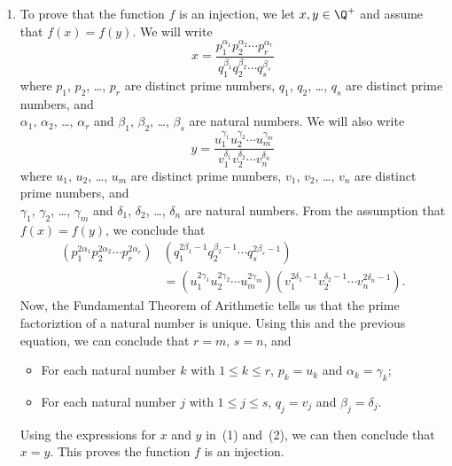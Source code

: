 \begin{enumerate}
\begin{enumerate}
\item To prove that the function $f$ is an injection, we let $x, y \in \Q^+$ and assume that $f(x) = f(y)$.  We will write
\begin{equation}
x = \dfrac{p_1^{\alpha_1} p_2^{\alpha_2} \cdots p_r^{\alpha_r}}{q_1^{\beta_1} q_2^{\beta_2} \cdots q_s^{\beta_s}}
\end{equation}
where $p_1$, $p_2$, \ldots, $p_r$ are distinct prime numbers, $q_1$, $q_2$, \ldots, $q_s$ are distinct prime numbers, and \\
$\alpha_1$, $\alpha_2$, \ldots, $\alpha_r$ and $\beta_1$, $\beta_2$, \ldots, $\beta_s$ are natural numbers.   We will also write
\begin{equation}
y = \dfrac{u_1^{\gamma_1} u_2^{\gamma_2} \cdots u_m^{\gamma_m}}{v_1^{\delta_1} v_2^{\delta_2} \cdots v_n^{\delta_n}}
\end{equation}
where $u_1$, $u_2$, \ldots, $u_m$ are distinct prime numbers, $v_1$, $v_2$, \ldots, $v_n$ are distinct prime numbers, and \\
$\gamma_1$, $\gamma_2$, \ldots, $\gamma_m$ and $\delta_1$, $\delta_2$, \ldots, $\delta_n$ are natural numbers.  From the assumption that $f(x) = f(y)$, we conclude that
\begin{align*}
\left( p_1^{2 \alpha_1} p_2^{2 \alpha_2} \cdots p_r^{2 \alpha_r} \right) &\left( q_1^{2 \beta_1-1} q_2^{ \beta_2-1} \cdots q_s^{2 \beta_s-1} \right) \\
 &= 
\left( u_1^{2 \gamma_1} u_2^{2 \gamma_2} \cdots u_m^{2 \gamma_m} \right) \left( v_1^{2 \delta_1-1} v_2^{ \delta_2-1} \cdots v_n^{2 \delta_n-1} \right).
\end{align*}
Now, the Fundamental Theorem of Arithmetic tells us that the prime factoriztion of a natural number is unique.  Using this and the previous equation, we can conclude that 
$r = m$, $s = n$, and 
\begin{itemize}
\item For each natural number $k$ with $1 \leq k \leq r$, $p_k = u_k$ and 
$\alpha_k = \gamma_k$;
\item For each natural number $j$ with $1 \leq j \leq s$, $q_j = v_j$ and 
$\beta_j = \delta_j$.
\end{itemize}
Using the expressions for $x$ and $y$ in~(1) and~(2), we can then conclude that $x = y$.  This proves the function $f$ is an injection.



\end{enumerate}
\end{enumerate}

